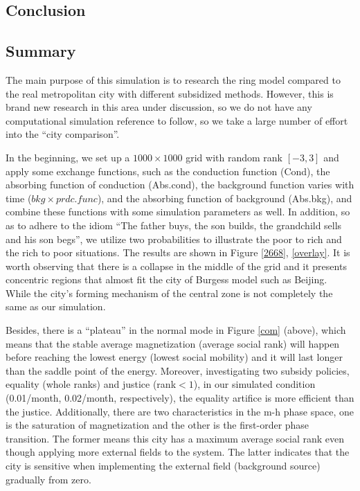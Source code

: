 \documentclass[10pt]{article}
\begin{document}
\begin{multicols}{2}
\section{Conclusion}
    \subsection{Summary}
        The main purpose of this simulation is to research the ring model compared to the real metropolitan city with different subsidized methods. However, this is brand new research in this area under discussion, so we do not have any computational simulation reference to follow, so we take a large number of effort into the ``city comparison''. 

        In the beginning, we set up a $1000 \times 1000$ grid with random rank $[-3,3]$ and apply some exchange functions, such as the conduction function (Cond), the absorbing function of conduction (Abs.cond), the background function varies with time ($bkg\times prdc.func$), and the absorbing function of background (Abs.bkg), and combine these functions with some simulation parameters as well. In addition, so as to adhere to the idiom ``The father buys, the son builds, the grandchild sells and his son begs'', we utilize two probabilities to illustrate the poor to rich and the rich to poor situations. The results are shown in Figure \ref{2668}, \ref{overlay}. It is worth observing that there is a collapse in the middle of the grid and it presents concentric regions that almost fit the city of Burgess model such as Beijing. While the city's forming mechanism of the central zone is not completely the same as our simulation.
        
        Besides, there is a ``plateau'' in the normal mode in Figure \ref{com} (above), which means that the stable average magnetization (average social rank) will happen before reaching the lowest energy (lowest social mobility) and it will last longer than the saddle point of the energy. Moreover, investigating two subsidy policies, equality (whole ranks) and justice (rank$<1$), in our simulated condition (0.01/month, 0.02/month, respectively), the equality artifice is more efficient than the justice. Additionally, there are two characteristics in the m-h phase space, one is the saturation of magnetization and the other is the first-order phase transition. The former means this city has a maximum average social rank even though applying more external fields to the system. The latter indicates that the city is sensitive when implementing the external field (background source) gradually from zero.
   

\end{multicols}
\end{document}
